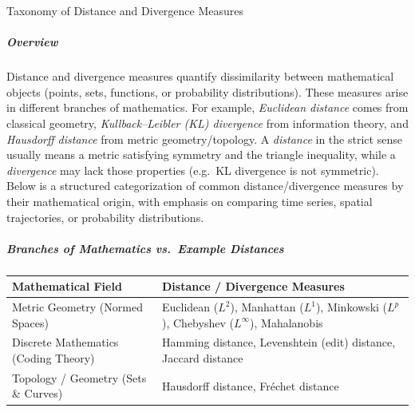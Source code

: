\documentclass{book}
\begin{document}
\begin{minipage}{\textwidth}
        
        \begin{center}
            {\LARGE Taxonomy of Distance and Divergence Measures}
        \end{center}
        
        \vspace{1em}
        
        
        \subparagraph*{Overview}
            Distance and divergence measures quantify dissimilarity between mathematical objects (points, sets, functions, or probability distributions). These measures arise in different branches of mathematics. For example, \emph{Euclidean distance} comes from classical geometry, \emph{Kullback--Leibler (KL) divergence} from information theory, and \emph{Hausdorff distance} from metric geometry/topology. A \emph{distance} in the strict sense usually means a metric satisfying symmetry and the triangle inequality, while a \emph{divergence} may lack those properties (e.g.\ KL divergence is not symmetric). Below is a structured categorization of common distance/divergence measures by their mathematical origin, with emphasis on comparing time series, spatial trajectories, or probability distributions.
        
        
        \subparagraph*{Branches of Mathematics vs.\ Example Distances}
            
            \begin{center}
                \begin{tabular}{>{\raggedright\arraybackslash}p{5cm} p{9cm}}
                    \toprule
                    \textbf{Mathematical Field} & \textbf{Distance / Divergence Measures} \\
                    \midrule
                    Metric Geometry (Normed Spaces) &
                    Euclidean ($L^2$), Manhattan ($L^1$), Minkowski ($L^p$), Chebyshev ($L^\infty$), Mahalanobis \\
                    
                    Discrete Mathematics (Coding Theory) &
                    Hamming distance, Levenshtein (edit) distance, Jaccard distance \\
                    
                    Topology / Geometry (Sets \& Curves) &
                    Hausdorff distance, Fr\'echet distance \\
                    

\end{tabular}
\end{center}
\end{minipage}
\end{document}
